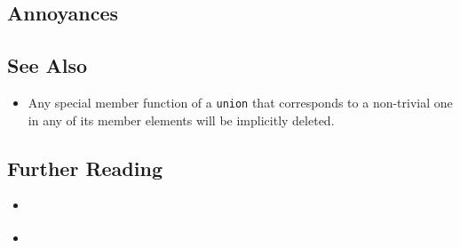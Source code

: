 \subsection[Annoyances]{Annoyances}\label{annoyances}

\hspace*{\fill}

\subsection[See Also]{See Also}\label{see-also}

\begin{itemize}
\item{%
Any special member function of a \lstinline!union! that corresponds to a non-trivial one in any of its member elements will be implicitly deleted.} %
\end{itemize}

\subsection[Further Reading]{Further Reading}\label{further-reading}

\begin{itemize}
\item{\cite{goldthwaite07}}
\item{\cite{ouellet16}}
\end{itemize}



